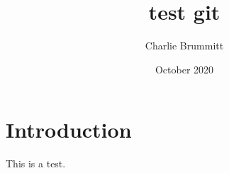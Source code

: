 \documentclass{article}
\title{test git}
\author{Charlie Brummitt}
\date{October 2020}
\begin{document}
\maketitle

\section{Introduction}
This is a test.
\end{document}
